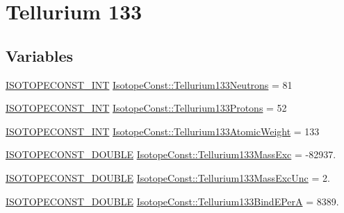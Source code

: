 \hypertarget{group___isotope_const-_tellurium-_te133}{}\section{Tellurium 133}
\label{group___isotope_const-_tellurium-_te133}
\subsection*{Variables}
\begin{DoxyCompactItemize}
\item 
\mbox{\hyperlink{group___isotope_const-_macros_ga5f18360b3e99483a35c32d789e62621c}{I\+S\+O\+T\+O\+P\+E\+C\+O\+N\+S\+T\+\_\+\+I\+NT}} \mbox{\hyperlink{group___isotope_const-_tellurium-_te133_gaa91a2f091d55ff2b1ed57d9d4196938a}{Isotope\+Const\+::\+Tellurium133\+Neutrons}} = 81
\item 
\mbox{\hyperlink{group___isotope_const-_macros_ga5f18360b3e99483a35c32d789e62621c}{I\+S\+O\+T\+O\+P\+E\+C\+O\+N\+S\+T\+\_\+\+I\+NT}} \mbox{\hyperlink{group___isotope_const-_tellurium-_te133_ga7ceb1a3c4c9878574cc5ae51dcfdff99}{Isotope\+Const\+::\+Tellurium133\+Protons}} = 52
\item 
\mbox{\hyperlink{group___isotope_const-_macros_ga5f18360b3e99483a35c32d789e62621c}{I\+S\+O\+T\+O\+P\+E\+C\+O\+N\+S\+T\+\_\+\+I\+NT}} \mbox{\hyperlink{group___isotope_const-_tellurium-_te133_ga0b5265c8fab504d1db5ed8142dfbd131}{Isotope\+Const\+::\+Tellurium133\+Atomic\+Weight}} = 133
\item 
\mbox{\hyperlink{group___isotope_const-_macros_ga8f45a7272ce02c0b4c65c44636ed719a}{I\+S\+O\+T\+O\+P\+E\+C\+O\+N\+S\+T\+\_\+\+D\+O\+U\+B\+LE}} \mbox{\hyperlink{group___isotope_const-_tellurium-_te133_gaf7ef407bec4f8c744f873d77eccce3ef}{Isotope\+Const\+::\+Tellurium133\+Mass\+Exc}} = -\/82937.
\item 
\mbox{\hyperlink{group___isotope_const-_macros_ga8f45a7272ce02c0b4c65c44636ed719a}{I\+S\+O\+T\+O\+P\+E\+C\+O\+N\+S\+T\+\_\+\+D\+O\+U\+B\+LE}} \mbox{\hyperlink{group___isotope_const-_tellurium-_te133_ga62ad21c5b37dc49c8d45a424acced3d9}{Isotope\+Const\+::\+Tellurium133\+Mass\+Exc\+Unc}} = 2.
\item 
\mbox{\hyperlink{group___isotope_const-_macros_ga8f45a7272ce02c0b4c65c44636ed719a}{I\+S\+O\+T\+O\+P\+E\+C\+O\+N\+S\+T\+\_\+\+D\+O\+U\+B\+LE}} \mbox{\hyperlink{group___isotope_const-_tellurium-_te133_ga1319d3938239e64d0f6cd4b3fe7f71c8}{Isotope\+Const\+::\+Tellurium133\+Bind\+E\+PerA}} = 8389.
\item 

\end{DoxyCompactItemize}
